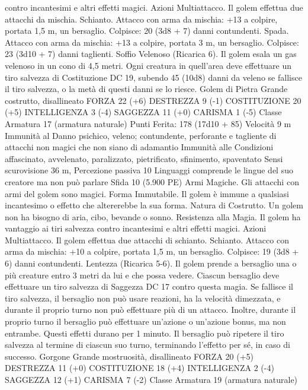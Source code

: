 \begin{multicols}{2}
contro incantesimi e altri effetti magici.
Azioni
Multiattacco. Il golem effettua due attacchi da mischia.
Schianto. Attacco con arma da mischia: +13 a colpire, portata
1,5 m, un bersaglio.
Colpisce: 20 (3d8 + 7) danni contundenti.
Spada. Attacco con arma da mischia: +13 a colpire, portata 3 m,
un bersaglio.
Colpisce: 23 (3d10 + 7) danni taglienti.
Soffio Velenoso (Ricarica 6). Il golem esala un gas velenoso in
un cono di 4,5 metri. Ogni creatura in quell’area deve effettuare
un tiro salvezza di Costituzione DC 19, subendo 45 (10d8) danni
da veleno se fallisce il tiro salvezza, o la metà di questi danni se
lo riesce.
Golem di Pietra
Grande costrutto, disallineato
FORZA 22 (+6)
DESTREZZA 9 (-1)
COSTITUZIONE 20 (+5)
INTELLIGENZA 3 (-4)
SAGGEZZA 11 (+0)
CARISMA 1 (-5)
Classe Armatura 17 (armatura naturale)
\hspace*{0pt}\hfill{Punti Ferita}: 178 (17d10 + 85)
Velocità 9 m
Immunità al Danno psichico, veleno; contundente, perforante e
tagliente di attacchi non magici che non siano di adamantio
Immunità alle Condizioni affascinato, avvelenato, paralizzato,
pietrificato, sfinimento, spaventato
Sensi scurovisione 36 m, Percezione passiva 10
Linguaggi comprende le lingue del suo creatore ma non può
parlare
Sfida 10 (5.900 PE)
Armi Magiche. Gli attacchi con armi del golem sono magici.
Forma Immutabile. Il golem è immune a qualsiasi incantesimo o
effetto che altererebbe la sua forma.
Natura di Costrutto. Un golem non ha bisogno di aria, cibo,
bevande o sonno.
Resistenza alla Magia. Il golem ha vantaggio ai tiri salvezza
contro incantesimi e altri effetti magici.
Azioni
Multiattacco. Il golem effettua due attacchi di schianto.
Schianto. Attacco con arma da mischia: +10 a colpire, portata
1,5 m, un bersaglio.
Colpisce: 19 (3d8 + 6) danni contundenti.
Lentezza (Ricarica 5-6). Il golem prende a bersaglio una o più
creature entro 3 metri da lui e che possa vedere. Ciascun
bersaglio deve effettuare un tiro salvezza di Saggezza DC 17
contro questa magia. Se fallisce il tiro salvezza, il bersaglio non
può usare reazioni, ha la velocità dimezzata, e durante il proprio
turno non può effettuare più di un attacco. Inoltre, durante il
proprio turno il bersaglio può effettuare un’azione o un’azione
bonus, ma non entrambe. Questi effetti durano per 1 minuto. Il
bersaglio può ripetere il tiro salvezza al termine di ciascun suo
turno, terminando l’effetto per sé, in caso di successo.
Gorgone
Grande mostruosità, disallineato
FORZA 20 (+5)
DESTREZZA 11 (+0)
COSTITUZIONE 18 (+4)
INTELLIGENZA 2 (-4)
SAGGEZZA 12 (+1)
CARISMA 7 (-2)
Classe Armatura 19 (armatura naturale)

\end{multicols}
